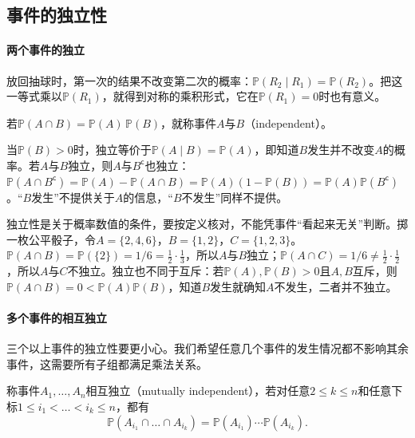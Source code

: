 \subsection{事件的独立性}
\label{sec:prob-event-independence}

\paragraph{两个事件的独立}
放回抽球时，第一次的结果不改变第二次的概率：$\mathbb{P}(R_2\mid R_1)=\mathbb{P}(R_2)$。把这一等式乘以$\mathbb{P}(R_1)$，就得到对称的乘积形式，它在$\mathbb{P}(R_1)=0$时也有意义。

\begin{definition}[事件的独立性]
\label{def:prob-independent-events}
若$\mathbb{P}(A\cap B)=\mathbb{P}(A)\,\mathbb{P}(B)$，就称事件$A$与$B$（independent）。
\end{definition}

当$\mathbb{P}(B)>0$时，独立等价于$\mathbb{P}(A\mid B)=\mathbb{P}(A)$，即知道$B$发生并不改变$A$的概率。若$A$与$B$独立，则$A$与$B^{\mathsf c}$也独立：$\mathbb{P}(A\cap B^{\mathsf c})=\mathbb{P}(A)-\mathbb{P}(A\cap B)=\mathbb{P}(A)(1-\mathbb{P}(B))=\mathbb{P}(A)\mathbb{P}(B^{\mathsf c})$。“$B$发生”不提供关于$A$的信息，“$B$不发生”同样不提供。

独立性是关于概率数值的条件，要按定义核对，不能凭事件“看起来无关”判断。掷一枚公平骰子，令$A=\{2,4,6\}$，$B=\{1,2\}$，$C=\{1,2,3\}$。$\mathbb{P}(A\cap B)=\mathbb{P}(\{2\})=1/6=\frac12\cdot\frac13$，所以$A$与$B$独立；$\mathbb{P}(A\cap C)=1/6\neq\frac12\cdot\frac12$，所以$A$与$C$不独立。独立也不同于互斥：若$\mathbb{P}(A),\mathbb{P}(B)>0$且$A,B$互斥，则$\mathbb{P}(A\cap B)=0<\mathbb{P}(A)\mathbb{P}(B)$，知道$B$发生就确知$A$不发生，二者并不独立。

\paragraph{多个事件的相互独立}
三个以上事件的独立性要更小心。我们希望任意几个事件的发生情况都不影响其余事件，这需要所有子组都满足乘法关系。

\begin{definition}[多个事件的相互独立]
\label{def:prob-mutual-independence}
称事件$A_1,\dots,A_n$相互独立（mutually independent），若对任意$2\leq k\leq n$和任意下标$1\leq i_1<\dots<i_k\leq n$，都有
\[
  \mathbb{P}(A_{i_1}\cap\dots\cap A_{i_k})=\mathbb{P}(A_{i_1})\cdots\mathbb{P}(A_{i_k}).
\]
\end{definition}

